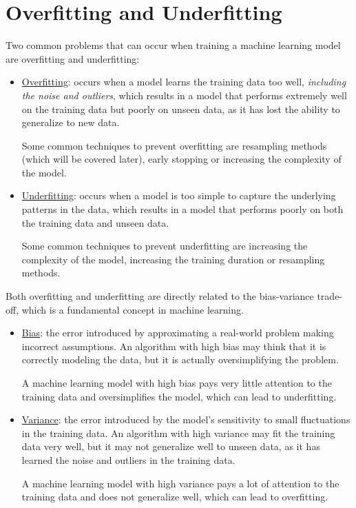 \section{Overfitting and Underfitting}

Two common problems that can occur when training a machine learning model are overfitting and underfitting:
\begin{itemize}
    \item \ul{Overfitting}: occurs when a model learns the training data too well, \emph{including the noise and outliers}, which results in a model that performs extremely well on the training data but poorly on unseen data, as it has lost the ability to generalize to new data.
    
    Some common techniques to prevent overfitting are resampling methods (which will be covered later), early stopping or increasing the complexity of the model.
    \item \ul{Underfitting}: occurs when a model is too simple to capture the underlying patterns in the data, which results in a model that performs poorly on both the training data and unseen data.
    
    Some common techniques to prevent underfitting are increasing the complexity of the model, increasing the training duration or resampling methods.
\end{itemize}

Both overfitting and underfitting are directly related to the bias-variance trade-off, which is a fundamental concept in machine learning.
\begin{itemize}
    \item \ul{Bias}: the error introduced by approximating a real-world problem making incorrect assumptions. An algorithm with high bias may think that it is correctly modeling the data, but it is actually oversimplifying the problem.
    
    A machine learning model with high bias pays very little attention to the training data and oversimplifies the model, which can lead to underfitting.
    \item \ul{Variance}: the error introduced by the model's sensitivity to small fluctuations in the training data. An algorithm with high variance may fit the training data very well, but it may not generalize well to unseen data, as it has learned the noise and outliers in the training data.
    
    A machine learning model with high variance pays a lot of attention to the training data and does not generalize well, which can lead to overfitting.
\end{itemize}

